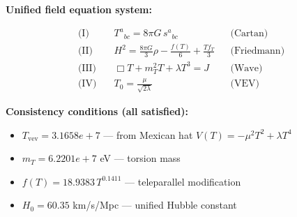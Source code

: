 
\textbf{Unified field equation system:}

\begin{align}
  \text{(I)} \quad & T^a{}_{bc} = 8\pi G \, s^a{}_{bc} && \text{(Cartan)} \\
  \text{(II)} \quad & H^2 = \frac{8\pi G}{3}\rho - \frac{f(T)}{6} + \frac{Tf_T}{3} && \text{(Friedmann)} \\
  \text{(III)} \quad & \Box T + m_T^2 T + \lambda T^3 = J && \text{(Wave)} \\
  \text{(IV)} \quad & T_0 = \frac{\mu}{\sqrt{2\lambda}} && \text{(VEV)}
\end{align}

\textbf{Consistency conditions (all satisfied):}
\begin{itemize}
  \item $T_{\text{vev}} = 3.1658e+7$ — from Mexican hat $V(T) = -\mu^2 T^2 + \lambda T^4$
  \item $m_T = 6.2201e+7$ eV — torsion mass
  \item $f(T) = 18.9383 \, T^{0.1411}$ — teleparallel modification
  \item $H_0 = 60.35$ km/s/Mpc — unified Hubble constant
\end{itemize}